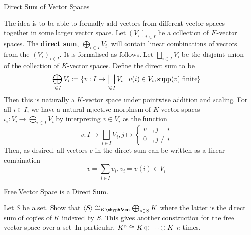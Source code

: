 \documentclass[../../book.tex]{subfiles}
\begin{document}
\begin{dfn} Direct Sum of Vector Spaces.
    
    The idea is to be able to formally add vectors from different vector spaces
    together in some larger vector space.
    Let $(V_i)_{i\in I}$ be a collection of $K$-vector spaces.
    The \textbf{direct sum}, $\bigoplus_{i\in I}V_i$, 
    will contain linear combinations of vectors from the $(V_i)_{i\in I}$.
    It is formalised as follows. 
    Let $\bigsqcup_{i\in I} V_i$ be the disjoint union 
    of the collection of $K$-vector spaces.
    Define the direct sum to be \[
        \bigoplus_{i\in I} V_i := \{v : I \to \bigsqcup_{i\in I} V_i \mid 
        v(i) \in V_i, \mathrm{supp } (v) \text{ finite}\}
    \]
    Then this is naturally a $K$-vector space under pointwise addition and scaling.
    For all $i \in I$, we have a natural injective morphism of $K$-vector spaces 
    $\iota_i : V_i \to \bigoplus_{i\in I} V_i$ by interpreting
    $v \in V_i$ as the function \[
        v : I \to \bigsqcup_{i\in I} V_i, j \mapsto \begin{cases}
            v   &, j = i\\
            
            0   &, j \neq i
        \end{cases}
    \]
    Then, as desired, all vectors $v$ in the direct sum can be written as
    a linear combination \[
        v = \sum_{i \in I} v_i , v_i = v(i) \in V_i
    \]
\end{dfn}
\begin{ex} Free Vector Space is a Direct Sum.
    
    Let $S$ be a set. 
    Show that $\<S\> \iso_{\KVec} \bigoplus_{s\in S} K$ where the latter is
    the direct sum of copies of $K$ indexed by $S$. 
    This gives another construction for the free vector space over a set. 
    In particular, $K^n \cong K \oplus \cdots \oplus K$ $n$-times. 
\end{ex}
\end{document}
